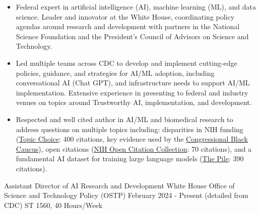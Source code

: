 \documentclass[]{scrartcl}
\begin{document}
\begin{cleanCV}

   \vspace{-1em}

   {
  \vspace{-0.25em}
  \begin{itemize}

  \item Federal expert in artificial intelligence (AI), machine learning (ML), and data science. Leader and innovator at the White House, coordinating policy agendas around research and development with partners in the National Science Foundation and the President's Council of Advisors on Science and Technology.
  \item Led multiple teams across CDC to develop and implement cutting-edge policies, guidance, and strategies for AI/ML adoption, including conversational AI (Chat GPT), and infrastructure needs to support AI/ML implementation. Extensive experience in presenting to federal and industry venues on topics around Trustworthy AI, implementation, and development. 
   \item Respected and well cited author in AI/ML and biomedical research to address questions on multiple topics including: disparities in NIH funding (\href{https://www.science.org/doi/10.1126/sciadv.aaw7238}{Topic Choice}: 400 citations, key evidence used by the \href{https://bluntrochester.house.gov/uploadedfiles/191220_ltr_to_nih_about_grant_disparities.pdf}{Congressional Black Caucus}), open citations (\href{https://www.ncbi.nlm.nih.gov/pmc/articles/PMC6786512/}{NIH Open Citation Collection}: 70 citations), and a fundamental AI dataset for training large language models (\href{https://arxiv.org/abs/2101.00027}{The Pile}: 390 citations).

  \end{itemize}
}

  \vspace{-1em}

\WorkExperience
{}
{Assistant Director of AI Research and Development}
{
  \newline White House Office of Science and Technology Policy (OSTP)
  \newline February 2024 - Present (detailed from CDC)
  \newline ST 1560, 40 Hours/Week
}
{
  \vspace{-0.25em}
  \begin{itemize}


\end{itemize}}
\end{cleanCV}
\end{document}
